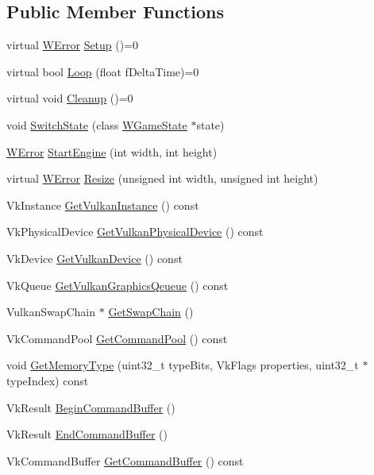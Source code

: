 \subsection*{Public Member Functions}
\begin{DoxyCompactItemize}
\item 
virtual \hyperlink{class_w_error}{W\+Error} \hyperlink{class_wasabi_ad90c79e1c06779720e589f083a7fe025}{Setup} ()=0
\item 
virtual bool \hyperlink{class_wasabi_ae7f699787307843fc886c4a9a09ebab7}{Loop} (float f\+Delta\+Time)=0
\item 
virtual void \hyperlink{class_wasabi_a521f6c42d5b85da50a7f59b829113b3d}{Cleanup} ()=0
\item 
void \hyperlink{class_wasabi_a2bd4372061953e71866b1939855a111e}{Switch\+State} (class \hyperlink{class_w_game_state}{W\+Game\+State} $\ast$state)
\item 
\hyperlink{class_w_error}{W\+Error} \hyperlink{class_wasabi_a9699f9a19b9bc45d776b651e6fe52c56}{Start\+Engine} (int width, int height)
\item 
virtual \hyperlink{class_w_error}{W\+Error} \hyperlink{class_wasabi_a5e0ed8a154eab65b712846e78d17f3b4}{Resize} (unsigned int width, unsigned int height)
\item 
Vk\+Instance \hyperlink{class_wasabi_a4b5e7d10e3b5f27fe885230a77713b72}{Get\+Vulkan\+Instance} () const 
\item 
Vk\+Physical\+Device \hyperlink{class_wasabi_ae2ee4ec587ef27c0f5b1e40594fc31d0}{Get\+Vulkan\+Physical\+Device} () const 
\item 
Vk\+Device \hyperlink{class_wasabi_a5edd27e89ef90056b3789c8c23b71552}{Get\+Vulkan\+Device} () const 
\item 
Vk\+Queue \hyperlink{class_wasabi_ad94ca1c35f5d210a704cf275d3219b20}{Get\+Vulkan\+Graphics\+Qeueue} () const 
\item 
Vulkan\+Swap\+Chain $\ast$ \hyperlink{class_wasabi_ad6e10af818f9d2737ac73d1d706f623f}{Get\+Swap\+Chain} ()
\item 
Vk\+Command\+Pool \hyperlink{class_wasabi_a27dc70a56a681ef9412588e951d34b2d}{Get\+Command\+Pool} () const 
\item 
void \hyperlink{class_wasabi_ab862c8828e86108020cfdd4712d67ab0}{Get\+Memory\+Type} (uint32\+\_\+t type\+Bits, Vk\+Flags properties, uint32\+\_\+t $\ast$type\+Index) const 
\item 
Vk\+Result \hyperlink{class_wasabi_aabe5ddaa4af93aaf22a8e860ef4692c7}{Begin\+Command\+Buffer} ()
\item 
Vk\+Result \hyperlink{class_wasabi_a568531d0d88bd488e5180989ced05f85}{End\+Command\+Buffer} ()
\item 
Vk\+Command\+Buffer \hyperlink{class_wasabi_a34faf987008a2282c12eefa8b08ec412}{Get\+Command\+Buffer} () const 
\end{DoxyCompactItemize}
